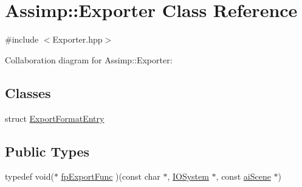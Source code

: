 \hypertarget{class_assimp_1_1_exporter}{\section{Assimp\+:\+:Exporter Class Reference}
\label{class_assimp_1_1_exporter}
}


{\ttfamily \#include $<$Exporter.\+hpp$>$}



Collaboration diagram for Assimp\+:\+:Exporter\+:
\subsection*{Classes}
\begin{DoxyCompactItemize}
\item 
struct \hyperlink{struct_assimp_1_1_exporter_1_1_export_format_entry}{Export\+Format\+Entry}
\end{DoxyCompactItemize}
\subsection*{Public Types}
\begin{DoxyCompactItemize}
\item 
typedef void($\ast$ \hyperlink{class_assimp_1_1_exporter_aa67334a75cb24e030af984d01e622f3b}{fp\+Export\+Func} )(const char $\ast$, \hyperlink{class_assimp_1_1_i_o_system}{I\+O\+System} $\ast$, const \hyperlink{structai_scene}{ai\+Scene} $\ast$)
\end{DoxyCompactItemize}
